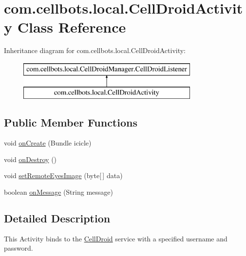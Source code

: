 \hypertarget{classcom_1_1cellbots_1_1local_1_1_cell_droid_activity}{\section{com.\-cellbots.\-local.\-Cell\-Droid\-Activity Class Reference}
\label{classcom_1_1cellbots_1_1local_1_1_cell_droid_activity}
}
Inheritance diagram for com.\-cellbots.\-local.\-Cell\-Droid\-Activity\-:\begin{figure}[H]
\begin{center}
\leavevmode
\includegraphics[height=2.000000cm]{classcom_1_1cellbots_1_1local_1_1_cell_droid_activity}
\end{center}
\end{figure}
\subsection*{Public Member Functions}
\begin{DoxyCompactItemize}
\item 
void \hyperlink{classcom_1_1cellbots_1_1local_1_1_cell_droid_activity_a235d07204cb6a42b999c76e9a729570f}{on\-Create} (Bundle icicle)
\item 
void \hyperlink{classcom_1_1cellbots_1_1local_1_1_cell_droid_activity_ab6c91d9d4755232bc99519c608715333}{on\-Destroy} ()
\item 
void \hyperlink{classcom_1_1cellbots_1_1local_1_1_cell_droid_activity_a57003ef87d71562d8e3955be2897fe12}{set\-Remote\-Eyes\-Image} (byte\mbox{[}$\,$\mbox{]} data)
\item 
boolean \hyperlink{classcom_1_1cellbots_1_1local_1_1_cell_droid_activity_a4087ad99bd679f3d50dddd6f1c7eba57}{on\-Message} (String message)
\end{DoxyCompactItemize}


\subsection{Detailed Description}
This Activity binds to the \hyperlink{classcom_1_1cellbots_1_1local_1_1_cell_droid}{Cell\-Droid} service with a specified username and password.


